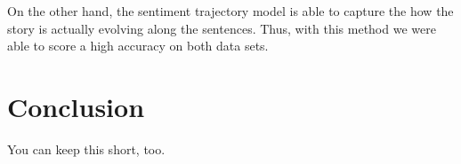 \documentclass{article}
\begin{document}
On the other hand, the sentiment trajectory model is able to capture the how the
story is actually evolving along the sentences. Thus, with this method we were
able to score a high accuracy on both data sets.


\section{Conclusion}
You can keep this short, too. \cite{*}



\end{document}
